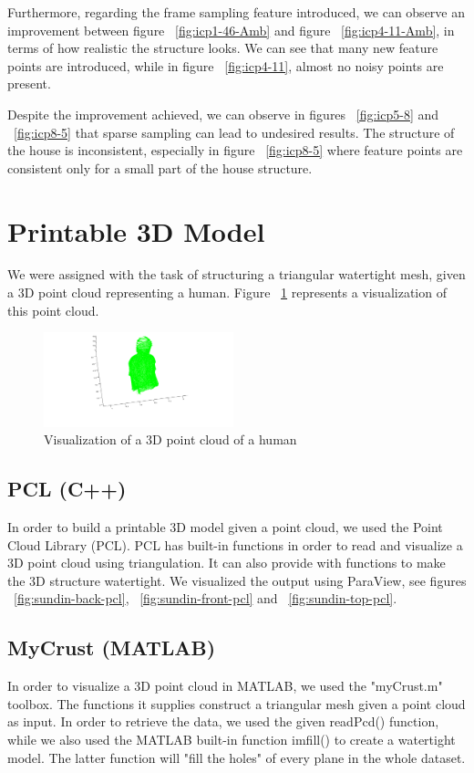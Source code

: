 Furthermore, regarding the frame sampling feature introduced, we can observe an improvement between figure ~\ref{fig:icp1-46-Amb} and figure ~\ref{fig:icp4-11-Amb}, in terms of how realistic the structure looks. We can see that many new feature points are introduced, while in figure ~\ref{fig:icp4-11}, almost no noisy points are present.

Despite the improvement achieved, we can observe in figures ~\ref{fig:icp5-8} and ~\ref{fig:icp8-5} that sparse sampling can lead to undesired results. The structure of the house is inconsistent, especially in figure ~\ref{fig:icp8-5} where feature points are consistent only for a small part of the house structure. 

\section{Printable 3D Model}

We were assigned with the task of structuring a triangular watertight mesh, given a 3D point cloud representing a human.
Figure ~\ref{fig:sundin-pointcloud} represents a visualization of this point cloud.
\begin{figure}[ht!]
  \centering
    \includegraphics[width=0.49\textwidth]
    {figures/pointCloud_sundin.png}
    \caption{Visualization of a 3D point cloud of a human}
    \label{fig:sundin-pointcloud}
\end{figure}


\subsection{PCL (C++)}
In order to build a printable 3D model given a point cloud, we used the Point Cloud Library (PCL)\cite{pcl}. PCL has built-in functions in order to read and visualize a 3D point cloud using triangulation. It can also provide with functions to make the 3D structure watertight.
We visualized the output using ParaView, see figures ~\ref{fig:sundin-back-pcl}, ~\ref{fig:sundin-front-pcl} and ~\ref{fig:sundin-top-pcl}.

\subsection{MyCrust (MATLAB)}
In order to visualize a 3D point cloud in MATLAB, we used the "myCrust.m" toolbox. The functions it supplies construct a triangular mesh given a point cloud as input. In order to retrieve the data, we used the given readPcd() function, while we also used the MATLAB built-in function imfill() to create a watertight model. The latter function will "fill the holes" of every plane in the whole dataset. 

